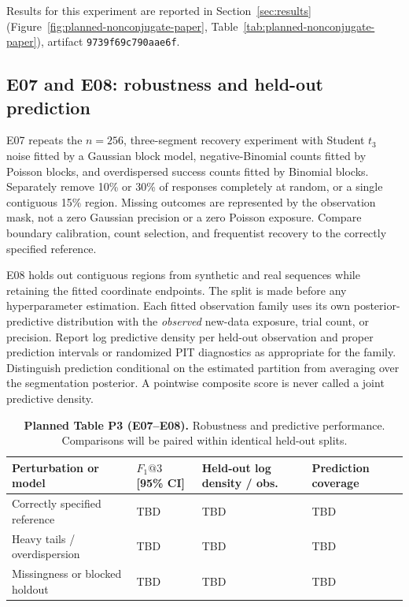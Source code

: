 Results for this experiment are reported in Section~\ref{sec:results} (Figure~\ref{fig:planned-nonconjugate-paper}, Table~\ref{tab:planned-nonconjugate-paper}), artifact \texttt{9739f69c790aae6f}.

\subsection{E07 and E08: robustness and held-out prediction}
E07 repeats the $n=256$, three-segment recovery experiment with Student
$t_3$ noise fitted by a Gaussian block model, negative-Binomial counts fitted
by Poisson blocks, and overdispersed success counts fitted by Binomial blocks.
Separately remove 10\% or 30\% of responses completely at random, or a single
contiguous 15\% region. Missing outcomes are represented by the observation
mask, not a zero Gaussian precision or a zero Poisson exposure. Compare
boundary calibration, count selection, and frequentist recovery to the
correctly specified reference.

E08 holds out contiguous regions from synthetic and real sequences while
retaining the fitted coordinate endpoints. The split is made before any
hyperparameter estimation. Each fitted observation family uses its own
posterior-predictive distribution with the \emph{observed} new-data exposure,
trial count, or precision. Report log predictive density per held-out
observation and proper prediction intervals or randomized PIT diagnostics as
appropriate for the family. Distinguish prediction conditional on the
estimated partition from averaging over the segmentation posterior. A
pointwise composite score is never called a joint predictive density.

\begin{table}[!htbp]
\centering\small
\caption{\textbf{Planned Table P3 (E07--E08).} Robustness and predictive
performance. Comparisons will be paired within identical held-out splits.}
\label{tab:planned-robustness-paper}
\begin{tabularx}{0.94\textwidth}{@{}L{0.34\textwidth}L{0.22\textwidth}L{0.20\textwidth}Y@{}}
\toprule
Perturbation or model & $F_1@3$ [95\% CI] & Held-out log density / obs. & Prediction coverage \\
\midrule
Correctly specified reference & TBD & TBD & TBD \\
Heavy tails / overdispersion & TBD & TBD & TBD \\
Missingness or blocked holdout & TBD & TBD & TBD \\
\bottomrule
\end{tabularx}
\end{table}

